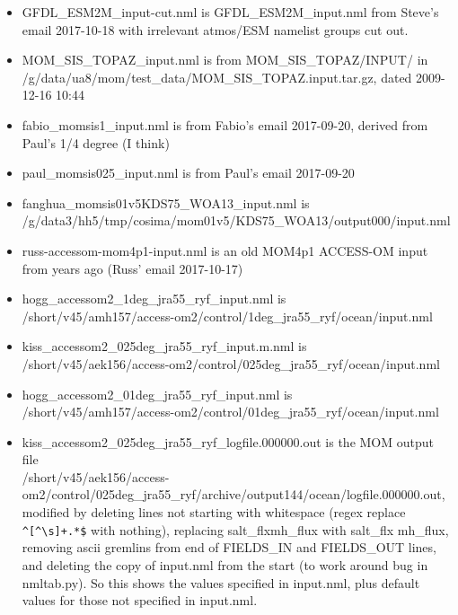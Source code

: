 \documentclass[10pt]{article}
\begin{document}
\begin{itemize}
\item GFDL_ESM2M_input-cut.nml is GFDL_ESM2M_input.nml from Steve's email 2017-10-18 with irrelevant atmos/ESM namelist groups cut out. %
\item MOM_SIS_TOPAZ_input.nml is from MOM_SIS_TOPAZ/INPUT/ in\\ /g/data/ua8/mom/test_data/MOM_SIS_TOPAZ.input.tar.gz, dated 2009-12-16 10:44
\item fabio_momsis1_input.nml is from Fabio's email 2017-09-20, derived from Paul's 1/4 degree (I think)
\item paul_momsis025_input.nml is from Paul's email 2017-09-20
\item fanghua_momsis01v5KDS75_WOA13_input.nml is \\ /g/data3/hh5/tmp/cosima/mom01v5/KDS75_WOA13/output000/input.nml
\item russ-accessom-mom4p1-input.nml is an old MOM4p1 ACCESS-OM input from years ago (Russ' email 2017-10-17)
\item hogg_accessom2_1deg_jra55_ryf_input.nml is \\ /short/v45/amh157/access-om2/control/1deg_jra55_ryf/ocean/input.nml
\item kiss_accessom2_025deg_jra55_ryf_input.m.nml is \\ /short/v45/aek156/access-om2/control/025deg_jra55_ryf/ocean/input.nml
\item hogg_accessom2_01deg_jra55_ryf_input.nml is \\ /short/v45/amh157/access-om2/control/01deg_jra55_ryf/ocean/input.nml
\item kiss_accessom2_025deg_jra55_ryf_logfile.000000.out is the MOM output file\\ 
/short/v45/aek156/access-om2/control/025deg_jra55_ryf/archive/output144/ocean/logfile.000000.out, \\
modified by deleting lines not starting with whitespace (regex replace \verb!^[^\s]+.*$! with nothing), replacing salt_flxmh_flux with salt_flx mh_flux, removing ascii gremlins from end of FIELDS_IN and FIELDS_OUT lines,  and deleting the copy of input.nml from the start (to work around bug in nmltab.py). So this shows the values specified in input.nml, plus default values for those not specified in input.nml. 
\end{itemize}
\end{document}
